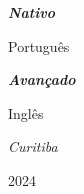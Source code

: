 \documentclass{article}
\begin{document}
{\large

\textbf{\textit{Nativo}}

\hspace{2em}Português

\textbf{\textit{Avançado}}

\hspace{2em}Inglês

}

\vfill
    \begin{center}
        {\Large 
        \textit{Curitiba}

        2024
        }
    \end{center}
\end{document}
